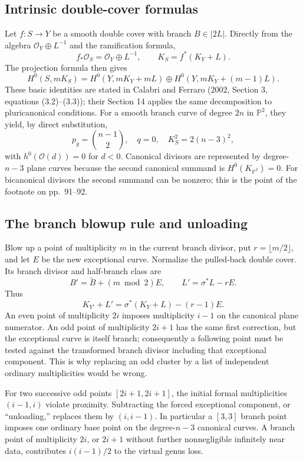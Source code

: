 \subsection{Intrinsic double-cover formulas}

Let \(f:S\to Y\) be a smooth double cover with branch \(B\in|2L|\). Directly from the algebra \(\mathcal O_Y\oplus L^{-1}\) and the ramification formula, \[
f_*\mathcal O_S=\mathcal O_Y\oplus L^{-1},\qquad
K_S=f^*(K_Y+L).
\] The projection formula then gives \[
H^0(S,mK_S)=H^0(Y,mK_Y+mL)
\oplus H^0(Y,mK_Y+(m-1)L).
\tag{III.4}
\] These basic identities are stated in Calabri and Ferraro (2002, Section 3, equations (3.2)--(3.3)); their Section 14 applies the same decomposition to pluricanonical conditions. For a smooth branch curve of degree \(2n\) in \(\mathbb{P}^2\), they yield, by direct substitution, \[
p_g=\binom{n-1}{2},\quad q=0,\quad K_S^2=2(n-3)^2,
\] with \(h^0(\mathcal O(d))=0\) for \(d<0\). Canonical divisors are represented by degree-\(n-3\) plane curves because the second canonical summand is \(H^0(K_{\mathbb{P}^2})=0\). For bicanonical divisors the second summand can be nonzero; this is the point of the footnote on pp.~91--92.

\subsection{The branch blowup rule and unloading}

Blow up a point of multiplicity \(m\) in the current branch divisor, put \(r=\lfloor m/2\rfloor\), and let \(E\) be the new exceptional curve. Normalize the pulled-back double cover. Its branch divisor and half-branch class are \[
B'=\widetilde B+(m\bmod2)E,\qquad
L'=\sigma^*L-rE.
\] Thus \[
K_{Y'}+L'=\sigma^*(K_Y+L)-(r-1)E.
\tag{III.5}
\] An even point of multiplicity \(2i\) imposes multiplicity \(i-1\) on the canonical plane numerator. An odd point of multiplicity \(2i+1\) has the same first correction, but the exceptional curve is itself branch; consequently a following point must be tested against the transformed branch divisor including that exceptional component. This is why replacing an odd cluster by a list of independent ordinary multiplicities would be wrong.

For two successive odd points \([2i+1,2i+1]\), the initial formal multiplicities \((i-1,i)\) violate proximity. Subtracting the forced exceptional component, or ``unloading,'' replaces them by \((i,i-1)\). In particular a \([3,3]\) branch point imposes one ordinary base point on the degree-\(n-3\) canonical curves. A branch point of multiplicity \(2i\), or \(2i+1\) without further nonnegligible infinitely near data, contributes \(i(i-1)/2\) to the virtual genus loss.


